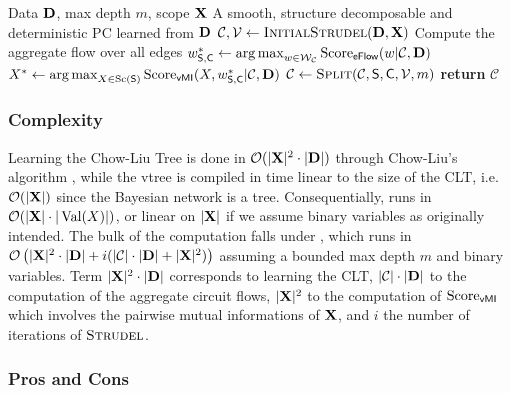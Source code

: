\begin{algorithm}[t]
  \caption{}\label{alg:strudel}
  \begin{algorithmic}[1]
    \Require Data $\mathbf{D}$, max depth $m$, scope $\mathbf{X}$
    \Ensure A smooth, structure decomposable and deterministic PC learned from $\mathbf{D}$
    \State $\mathcal{C},\vtree\gets\textproc{InitialStrudel}(\set{D},\set{X})$
      \State Compute the aggregate flow over all edges
      \State $w_{\operatorname{\textsf{S}},\operatorname{\textsf{C}}}^\ast\gets\operatorname*{\normalfont{arg\,max}}_{w\in\mathcal{W}_\mathcal{C}}\operatorname{\normalfont{Score}}_{\textsf{eFlow}}(w|\mathcal{C},\mathbf{D})$
      \State $X^\ast\gets\operatorname*{\normalfont{arg\,max}}_{X\in\operatorname*{\normalfont{Sc}}(\operatorname{\textsf{S}})}\operatorname{\normalfont{Score}}_{\textsf{vMI}}(X,w_{\operatorname{\textsf{S}},\operatorname{\textsf{C}}}^\ast|\mathcal{C},\mathbf{D})$
      \State $\mathcal{C}\gets\textproc{Split}(\mathcal{C},\Sum,\Child,\vtree,m)$
    \EndWhile
    \State \textbf{return} $\mathcal{C}$
  \end{algorithmic}
\end{algorithm}

\subsubsection{Complexity}

Learning the Chow-Liu Tree is done in $\mathcal{O}(|\mathbf{X}|^2\cdot|\mathbf{D}|)$ through Chow-Liu's
algorithm \citep{chow68}, while the vtree is compiled in time linear to the size of the CLT, i.e.\
$\mathcal{O}(|\mathbf{X}|)$ since the Bayesian network is a tree. Consequentially, 
runs in $\mathcal{O}(|\mathbf{X}|\cdot|\operatorname*{\normalfont{Val}}(X)|)$, or linear on $|\mathbf{X}|$ if we assume binary variables as
originally intended. The bulk of the computation falls under \textproc{Strudel}, which runs in
$\mathcal{O}\left(|\mathbf{X}|^2\cdot|\mathbf{D}|+i(|\mathcal{C}|\cdot|\mathbf{D}|+|\mathbf{X}|^2)\right)$ assuming a
bounded max depth $m$ and binary variables. Term $|\mathbf{X}|^2\cdot|\mathbf{D}|$ corresponds to learning
the CLT, $|\mathcal{C}|\cdot|\mathbf{D}|$ to the computation of the aggregate circuit flows,
$|\mathbf{X}|^2$ to the computation of $\operatorname{\normalfont{Score}}_{\textsf{vMI}}$ which involves the pairwise mutual
informations of $\mathbf{X}$, and $i$ the number of iterations of $\textproc{Strudel}$.

\subsubsection{Pros and Cons}

